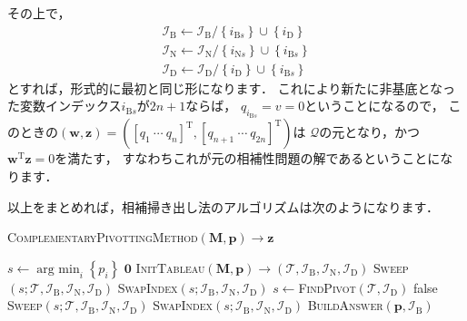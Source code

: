 \documentclass[a4paper]{jsarticle}
\begin{document}
その上で，
\begin{align*}
\mathcal{I}_{\mathrm{B}}\leftarrow \mathcal{I}_{\mathrm{B}}/\left\{i_{\mathrm{B}s}\right\}\cup\left\{i_{\mathrm{D}}\right\} \\
\mathcal{I}_{\mathrm{N}}\leftarrow \mathcal{I}_{\mathrm{N}}/\left\{i_{\mathrm{N}s}\right\}\cup\left\{i_{\mathrm{B}s}\right\} \\
\mathcal{I}_{\mathrm{D}}\leftarrow \mathcal{I}_{\mathrm{D}}/\left\{i_{\mathrm{D}}\right\}\cup\left\{i_{\mathrm{B}s}\right\}
\end{align*}
とすれば，形式的に最初と同じ形になります．
これにより新たに非基底となった変数インデックス$i_{\mathrm{B}s}$が$2n+1$ならば，
$q_{i_{\mathrm{B}s}}=v=0$ということになるので，
このときの$\left(\boldsymbol{w},\boldsymbol{z}\right)=\left(\left[q_{1}~\cdots~q_{n}\right]^{\mathrm{T}},\left[q_{n+1}~\cdots~q_{2n}\right]^{\mathrm{T}}\right)$は
$\mathcal{Q}$の元となり，かつ$\boldsymbol{w}^{\mathrm{T}}\boldsymbol{z}=0$を満たす，
すなわちこれが元の相補性問題の解であるということになります．

以上をまとめれば，相補掃き出し法のアルゴリズムは次のようになります．

\begin{algorithm}[tbh]
\caption{\textsc{ComplementaryPivottingMethod}$(\boldsymbol{M},\boldsymbol{p})\rightarrow\boldsymbol{z}$}
\label{alg:direct_divide}
\begin{algorithmic}[1]
\State $s\leftarrow\mathop{\mathrm{arg~min}}_{i}\left\{p_{i}\right\}$
   $\boldsymbol{0}$
\EndIf
\State \textsc{InitTableau}$(\boldsymbol{M},\boldsymbol{p})\rightarrow(\mathcal{T},\mathcal{I}_{\mathrm{B}},\mathcal{I}_{\mathrm{N}},\mathcal{I}_{\mathrm{D}})$
\State \textsc{Sweep}$(s;\mathcal{T},\mathcal{I}_{\mathrm{B}},\mathcal{I}_{\mathrm{N}},\mathcal{I}_{\mathrm{D}})$
\State \textsc{SwapIndex}$(s;\mathcal{I}_{\mathrm{B}},\mathcal{I}_{\mathrm{N}},\mathcal{I}_{\mathrm{D}})$
\Repeat
  \State $s\leftarrow$\textsc{FindPivot}$(\mathcal{T},\mathcal{I}_{\mathrm{D}})$
     false
  \EndIf
  \State \textsc{Sweep}$(s;\mathcal{T},\mathcal{I}_{\mathrm{B}},\mathcal{I}_{\mathrm{N}},\mathcal{I}_{\mathrm{D}})$
  \State \textsc{SwapIndex}$(s;\mathcal{I}_{\mathrm{B}},\mathcal{I}_{\mathrm{N}},\mathcal{I}_{\mathrm{D}})$
 \textsc{BuildAnswer}$(\boldsymbol{p},\mathcal{I}_{\mathrm{B}})$
\end{algorithmic}
\end{algorithm}
\end{document}
